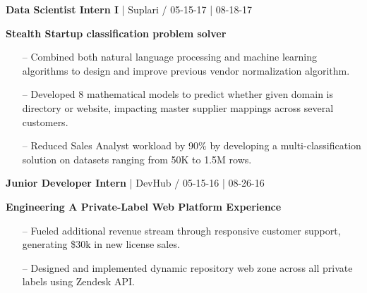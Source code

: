\documentclass{article}
\begin{document}
\begin{multicols}{2}
\hfill \break
{\footnotesize{\textbf{Data Scientist Intern I} | Suplari / 05-15-17 | 08-18-17}}
{\footnotesize{
\newline\textbf{Stealth Startup classification problem solver}
\begin{itemize}
	\item[--] Combined both natural language processing and machine learning algorithms to design and improve previous vendor normalization algorithm.
	\item[--] Developed 8 mathematical models to predict whether given domain is directory or website, impacting master supplier mappings across several customers.
	\item[--] Reduced Sales Analyst workload by 90\% by developing a multi-classification solution on datasets ranging from 50K to 1.5M rows.
\end{itemize}
}}
\hfill \break
{\footnotesize{\textbf{Junior Developer Intern} | DevHub / 05-15-16 | 08-26-16}}
{\footnotesize{
\newline\textbf{Engineering A Private-Label Web Platform Experience}
\begin{itemize}
	\item[--] Fueled additional revenue stream through responsive customer support, generating \$30k in new license sales. 
	\item[--] Designed and implemented dynamic repository web zone across all private labels using Zendesk API.
\end{itemize}
}}

\end{multicols}
\end{document}
